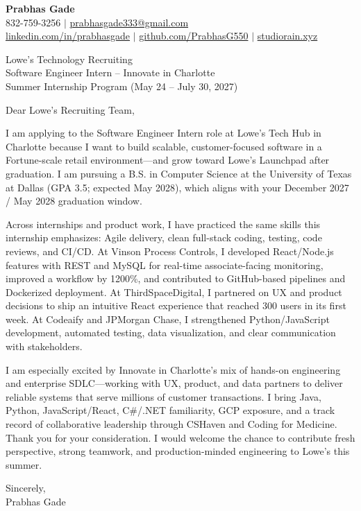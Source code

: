 \documentclass[letterpaper,11pt]{letter}
\begin{document}
\begin{flushleft}
\textbf{\large Prabhas Gade}\\
832-759-3256 $|$ \href{mailto:prabhasgade333@gmail.com}{prabhasgade333@gmail.com}\\
\href{https://linkedin.com/in/prabhasgade}{linkedin.com/in/prabhasgade} $|$
\href{https://github.com/PrabhasG550}{github.com/PrabhasG550} $|$
\href{https://studiorain.xyz}{studiorain.xyz}
\end{flushleft}

\vspace{6pt}
\begin{flushleft}
Lowe's Technology Recruiting\\
Software Engineer Intern -- Innovate in Charlotte\\
Summer Internship Program (May 24 -- July 30, 2027)
\end{flushleft}

Dear Lowe's Recruiting Team,

I am applying to the Software Engineer Intern role at Lowe's Tech Hub in Charlotte because I want to build scalable, customer-focused software in a Fortune-scale retail environment---and grow toward Lowe's Launchpad after graduation. I am pursuing a B.S. in Computer Science at the University of Texas at Dallas (GPA 3.5; expected May 2028), which aligns with your December 2027 / May 2028 graduation window.

Across internships and product work, I have practiced the same skills this internship emphasizes: Agile delivery, clean full-stack coding, testing, code reviews, and CI/CD. At Vinson Process Controls, I developed React/Node.js features with REST and MySQL for real-time associate-facing monitoring, improved a workflow by 1200\%, and contributed to GitHub-based pipelines and Dockerized deployment. At ThirdSpaceDigital, I partnered on UX and product decisions to ship an intuitive React experience that reached 300 users in its first week. At Codeaify and JPMorgan Chase, I strengthened Python/JavaScript development, automated testing, data visualization, and clear communication with stakeholders.

I am especially excited by Innovate in Charlotte's mix of hands-on engineering and enterprise SDLC---working with UX, product, and data partners to deliver reliable systems that serve millions of customer transactions. I bring Java, Python, JavaScript/React, C\#/.NET familiarity, GCP exposure, and a track record of collaborative leadership through CSHaven and Coding for Medicine. Thank you for your consideration. I would welcome the chance to contribute fresh perspective, strong teamwork, and production-minded engineering to Lowe's this summer.

Sincerely,\\
Prabhas Gade
\end{document}
